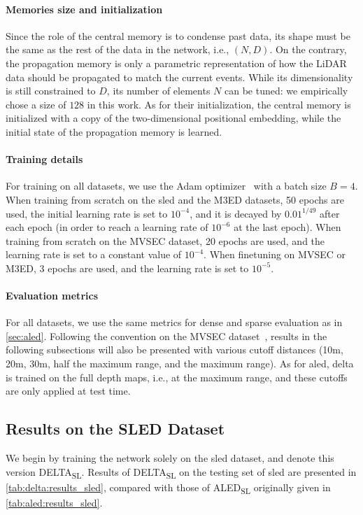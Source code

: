 \paragraph{Memories size and initialization}\label{sec:delta:eval:impl_detail:memory_size}
Since the role of the central memory is to condense past data, its shape must be the same as the rest of the data in the network, i.e., \((N, D)\). On the contrary, the propagation memory is only a parametric representation of how the LiDAR data should be propagated to match the current events. While its dimensionality is still constrained to \(D\), its number of elements \(N\) can be tuned: we empirically chose a size of \(128\) in this work. As for their initialization, the central memory is initialized with a copy of the two-dimensional positional embedding, while the initial state of the propagation memory is learned.

\paragraph{Training details}
For training on all datasets, we use the Adam optimizer~\cite{Kingma2015AdamAM} with a batch size \(B = 4\). When training from scratch on the \acrshort{sled} and the M3ED datasets, 50 epochs are used, the initial learning rate is set to \(10^{-4}\), and it is decayed by \(0.01^{1/49}\) after each epoch (in order to reach a learning rate of \(10^{-6}\) at the last epoch). When training from scratch on the MVSEC dataset, 20 epochs are used, and the learning rate is set to a constant value of \(10^{-4}\). When finetuning on MVSEC or M3ED, 3 epochs are used, and the learning rate is set to \(10^{-5}\).

\paragraph{Evaluation metrics}
For all datasets, we use the same metrics for dense and sparse evaluation as in \cref{sec:aled}. Following the convention on the MVSEC dataset~\cite{Zhu2018TheMS}, results in the following subsections will also be presented with various cutoff distances (10m, 20m, 30m, half the maximum range, and the maximum range). As for \acrshort{aled}, \acrshort{delta} is trained on the full depth maps, i.e., at the maximum range, and these cutoffs are only applied at test time.

\subsection{Results on the SLED Dataset}\label{sec:delta:eval:results_sled}
We begin by training the network solely on the \acrshort{sled} dataset, and denote this version DELTA\textsubscript{SL}. Results of DELTA\textsubscript{SL} on the testing set of \acrshort{sled} are presented in \cref{tab:delta:results_sled}, compared with those of ALED\textsubscript{SL} originally given in \cref{tab:aled:results_sled}.

